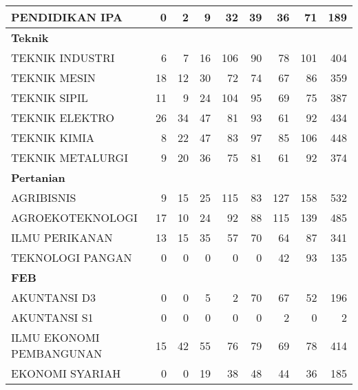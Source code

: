\documentclass[
]{book}
\begin{document}
\begin{table}[H]
\begin{tabular}{l|r|r|r|r|r|r|r|r}
\hline
\hspace{1em}PENDIDIKAN IPA & 0 & 2 & 9 & 32 & 39 & 36 & 71 & 189\\
\hline
\multicolumn{9}{l}{\textbf{Teknik}}\\
\hline
\hspace{1em}TEKNIK INDUSTRI & 6 & 7 & 16 & 106 & 90 & 78 & 101 & 404\\
\hline
\hspace{1em}TEKNIK MESIN & 18 & 12 & 30 & 72 & 74 & 67 & 86 & 359\\
\hline
\hspace{1em}TEKNIK SIPIL & 11 & 9 & 24 & 104 & 95 & 69 & 75 & 387\\
\hline
\hspace{1em}TEKNIK ELEKTRO & 26 & 34 & 47 & 81 & 93 & 61 & 92 & 434\\
\hline
\hspace{1em}TEKNIK KIMIA & 8 & 22 & 47 & 83 & 97 & 85 & 106 & 448\\
\hline
\hspace{1em}TEKNIK METALURGI & 9 & 20 & 36 & 75 & 81 & 61 & 92 & 374\\
\hline
\multicolumn{9}{l}{\textbf{Pertanian}}\\
\hline
\hspace{1em}AGRIBISNIS & 9 & 15 & 25 & 115 & 83 & 127 & 158 & 532\\
\hline
\hspace{1em}AGROEKOTEKNOLOGI & 17 & 10 & 24 & 92 & 88 & 115 & 139 & 485\\
\hline
\hspace{1em}ILMU PERIKANAN & 13 & 15 & 35 & 57 & 70 & 64 & 87 & 341\\
\hline
\hspace{1em}TEKNOLOGI PANGAN & 0 & 0 & 0 & 0 & 0 & 42 & 93 & 135\\
\hline
\multicolumn{9}{l}{\textbf{FEB}}\\
\hline
\hspace{1em}AKUNTANSI D3 & 0 & 0 & 5 & 2 & 70 & 67 & 52 & 196\\
\hline
\hspace{1em}AKUNTANSI S1 & 0 & 0 & 0 & 0 & 0 & 2 & 0 & 2\\
\hline
\hspace{1em}ILMU EKONOMI PEMBANGUNAN & 15 & 42 & 55 & 76 & 79 & 69 & 78 & 414\\
\hline
\hspace{1em}EKONOMI SYARIAH & 0 & 0 & 19 & 38 & 48 & 44 & 36 & 185\\
\hline

\end{tabular}
\end{table}
\end{document}
